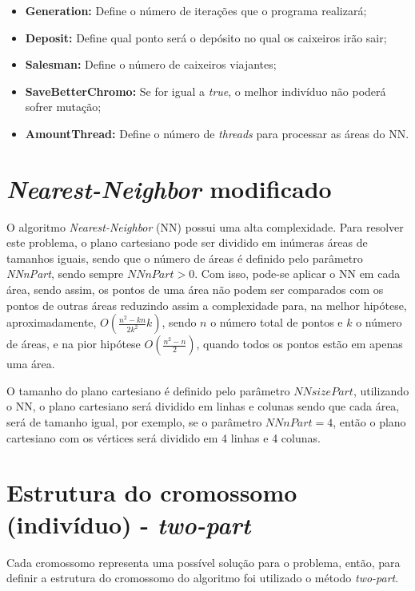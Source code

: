 \documentclass[12pt,openright,a4paper,oneside]{tcc}
\begin{document}
\begin{itemize}
                \item \textbf{Generation:} Define o número de iterações que o programa realizará;
                \item \textbf{Deposit:} Define qual ponto será o depósito no qual os caixeiros irão sair;
                \item \textbf{Salesman:} Define o número de caixeiros viajantes;
                \item \textbf{SaveBetterChromo:} Se for igual a \textit{true}, o melhor indivíduo não poderá sofrer mutação;
                \item \textbf{AmountThread:} Define o número de \textit{threads} para processar as áreas do NN.
            \end{itemize}   

		\section {\textit{Nearest-Neighbor} modificado}

		O algoritmo \textit{Nearest-Neighbor} (NN) possui uma alta complexidade. Para resolver este problema, o plano cartesiano pode ser dividido em inúmeras áreas de tamanhos iguais, sendo que o número de áreas é definido pelo parâmetro \textit{NNnPart}, sendo sempre $NNnPart > 0$. 
		Com isso, pode-se aplicar o NN em cada área, sendo assim, os pontos de uma área não podem ser comparados com os pontos de outras áreas reduzindo assim a complexidade para, na melhor hipótese, aproximadamente, $O(\frac{n^2-kn}{2k^2}k)$, sendo $n$ o número total de pontos e $k$ o número de áreas, e na pior hipótese $O(\frac{n^2-n}{2})$, quando todos os pontos estão em apenas uma área. 
		
		O tamanho do plano cartesiano é definido pelo parâmetro $NNsizePart$, utilizando o NN, o plano cartesiano será dividido em linhas e colunas sendo que cada área, será de tamanho igual, por exemplo, se o parâmetro $NNnPart = 4$, então o plano cartesiano com os vértices será dividido em 4 linhas e 4 colunas.  
		
		
		\section{Estrutura do cromossomo (indivíduo) - \textit{two-part}}
		

			Cada cromossomo representa uma possível solução para o problema, então, para definir a estrutura do cromossomo do algoritmo foi utilizado o método \textit{two-part}.
\end{document}
